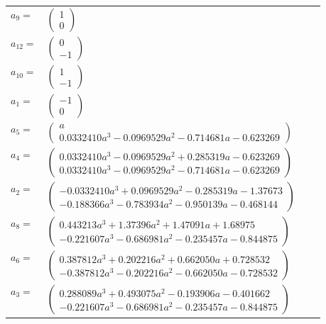 \documentclass[1p]{elsarticle_modified}
\theoremstyle{definition}
\begin{document}
\begin{tabular}{m{7pt} m{180pt} m{7pt} m{180pt} }
\flushright $a_{9}=$&$\begin{pmatrix}1\\0\end{pmatrix}$ \\
\flushright $a_{12}=$&$\begin{pmatrix}0\\-1\end{pmatrix}$ \\
\flushright $a_{10}=$&$\begin{pmatrix}1\\-1\end{pmatrix}$ \\
\flushright $a_{1}=$&$\begin{pmatrix}-1\\0\end{pmatrix}$ \\
\flushright $a_{5}=$&$\begin{pmatrix}a\\0.0332410 a^{3}-0.0969529 a^{2}-0.714681 a-0.623269\end{pmatrix}$ \\
\flushright $a_{4}=$&$\begin{pmatrix}0.0332410 a^{3}-0.0969529 a^{2}+0.285319 a-0.623269\\0.0332410 a^{3}-0.0969529 a^{2}-0.714681 a-0.623269\end{pmatrix}$ \\
\flushright $a_{2}=$&$\begin{pmatrix}-0.0332410 a^{3}+0.0969529 a^{2}-0.285319 a-1.37673\\-0.188366 a^{3}-0.783934 a^{2}-0.950139 a-0.468144\end{pmatrix}$ \\
\flushright $a_{8}=$&$\begin{pmatrix}0.443213 a^{3}+1.37396 a^{2}+1.47091 a+1.68975\\-0.221607 a^{3}-0.686981 a^{2}-0.235457 a-0.844875\end{pmatrix}$ \\
\flushright $a_{6}=$&$\begin{pmatrix}0.387812 a^{3}+0.202216 a^{2}+0.662050 a+0.728532\\-0.387812 a^{3}-0.202216 a^{2}-0.662050 a-0.728532\end{pmatrix}$ \\
\flushright $a_{3}=$&$\begin{pmatrix}0.288089 a^{3}+0.493075 a^{2}-0.193906 a-0.401662\\-0.221607 a^{3}-0.686981 a^{2}-0.235457 a-0.844875\end{pmatrix}$ \\

\end{tabular}
\end{document}
